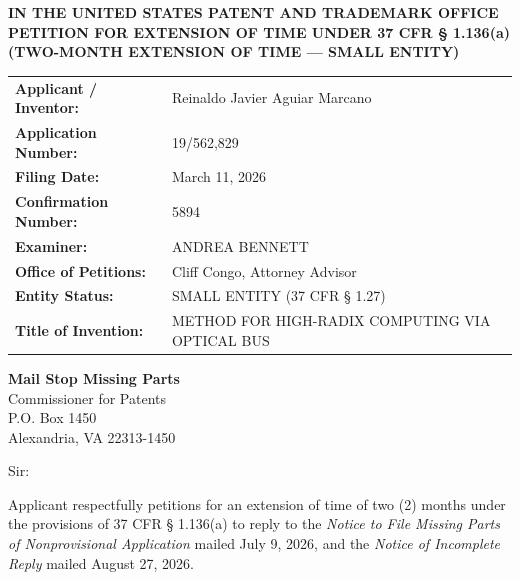 \documentclass[11pt,letterpaper]{article}
\begin{document}
\thispagestyle{empty}

\begin{center}
    \textbf{\large IN THE UNITED STATES PATENT AND TRADEMARK OFFICE} \\
    \vspace{0.3cm}
    \textbf{\large PETITION FOR EXTENSION OF TIME UNDER 37 CFR \S{} 1.136(a)} \\
    \textbf{\normalsize (TWO-MONTH EXTENSION OF TIME --- SMALL ENTITY)}
\end{center}

\vspace{0.4cm}
\noindent\begin{tabular}{p{2.3in}p{4.0in}}
\textbf{Applicant / Inventor:} & Reinaldo Javier Aguiar Marcano \\
\textbf{Application Number:} & 19/562,829 \\
\textbf{Filing Date:} & March 11, 2026 \\
\textbf{Confirmation Number:} & 5894 \\
\textbf{Examiner:} & ANDREA BENNETT \\
\textbf{Office of Petitions:} & Cliff Congo, Attorney Advisor \\
\textbf{Entity Status:} & SMALL ENTITY (37 CFR \S{} 1.27) \\
\textbf{Title of Invention:} & METHOD FOR HIGH-RADIX COMPUTING VIA OPTICAL BUS \\
\end{tabular}

\vspace{0.5cm}
\noindent\textbf{Mail Stop Missing Parts} \\
Commissioner for Patents \\
P.O. Box 1450 \\
Alexandria, VA 22313-1450

\vspace{0.2cm}
Sir:

Applicant respectfully petitions for an extension of time of two (2) months under the provisions of 37 CFR \S{} 1.136(a) to reply to the \textit{Notice to File Missing Parts of Nonprovisional Application} mailed July 9, 2026, and the \textit{Notice of Incomplete Reply} mailed August 27, 2026.
\end{document}
